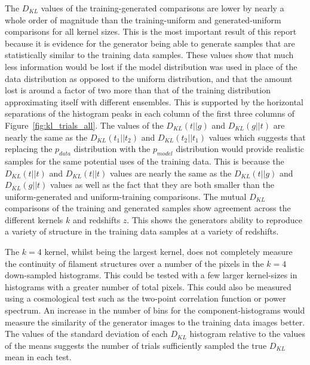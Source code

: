 \documentclass[twocolumn]{article}
\numberwithin{equation}{section}
\begin{document}
The $D_{KL}$ values of the training-generated comparisons are lower by nearly a whole order of magnitude than the 
training-uniform and generated-uniform comparisons for all kernel sizes. This is the most important result of this report 
because it is evidence for the generator being able to generate samples that are statistically similar to the training data
samples. These values show that much less information would be lost if the model distribution was used in place of the data 
distribution as opposed to the uniform distribution, and that the amount lost is around a factor of two more than that of the 
training distribution approximating itself with different ensembles. This is supported by the horizontal separations of the 
histogram peaks in each column of the first three columns of Figure~\ref{fig:kl_trials_all}. The values of the $D_{KL}(t||g)$ 
and $D_{KL}(g||t)$ are nearly the same as the $D_{KL}(t_1||t_2)$ and $D_{KL}(t_2||t_1)$ values which suggests that replacing 
the $p_{data}$ distribution with the $p_{model}$ distribution would provide realistic samples for the same potential uses 
of the training data. This is because the $D_{KL}(t||t)$ and $D_{KL}(t||t)$ values are nearly the same as the $D_{KL}(t||g)$
and $D_{KL}(g||t)$ values as well as the fact that they are both smaller than the uniform-generated and uniform-training 
comparisons. %
The mutual $D_{KL}$ comparisons of the training and generated samples show agreement across the different kernels $k$ and
redshifts $z$. This shows the generators ability to reproduce a variety of structure in the training data samples at a variety 
of redshifts. 

The $k=4$ kernel, whilst being the largest kernel, does not completely measure the continuity of filament structures over 
a number of the pixels in the $k=4$ down-sampled histograms. This could be tested with a few larger kernel-sizes in histograms 
with a greater number of total pixels. This could also be measured using a cosmological test such as the two-point correlation 
function or power spectrum. An increase in the number of bins for the component-histograms would measure the similarity of
the generator images to the training data images better. The values of the standard deviation of each $D_{KL}$ histogram 
relative to the values of the means suggests the number of trials sufficiently sampled the true $D_{KL}$ mean in each test.
\end{document}
